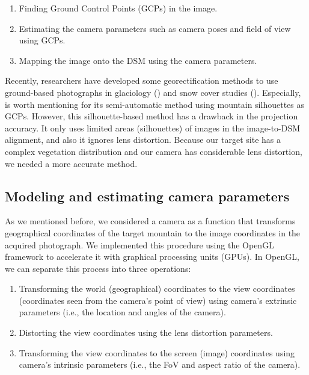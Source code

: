 \documentclass{article}
\providecommand{\tightlist}{%
  \setlength{\itemsep}{0pt}\setlength{\parskip}{0pt}}
\begin{document}
\begin{enumerate}
\def\labelenumi{\arabic{enumi}.}
\tightlist
\item
  Finding Ground Control Points (GCPs) in the image.\\
\item
  Estimating the camera parameters such as camera poses and field of view using GCPs.\\
\item
  Mapping the image onto the DSM using the camera parameters.
\end{enumerate}

Recently, researchers have developed some georectification methods to use ground-based photographs in glaciology (\cite{Messerli2015GeoInst}) and snow cover studies (\cite{Portenier2020Cryosphere}). Especially, \cite{Portenier2020Cryosphere} is worth mentioning for its semi-automatic method using mountain silhouettes as GCPs. However, this silhouette-based method has a drawback in the projection accuracy. It only uses limited areas (silhouettes) of images in the image-to-DSM alignment, and also it ignores lens distortion. Because our target site has a complex vegetation distribution and our camera has considerable lens distortion, we needed a more accurate method.

\hypertarget{modeling-and-estimating-camera-parameters}{%
\subsection{Modeling and estimating camera parameters}\label{modeling-and-estimating-camera-parameters}}

As we mentioned before, we considered a camera as a function that transforms geographical coordinates of the target mountain to the image coordinates in the acquired photograph. We implemented this procedure using the OpenGL framework to accelerate it with graphical processing units (GPUs). In OpenGL, we can separate this process into three operations:

\begin{enumerate}
\def\labelenumi{\arabic{enumi}.}
\tightlist
\item
  Transforming the world (geographical) coordinates to the view coordinates (coordinates seen from the camera's point of view) using camera's extrinsic parameters (i.e., the location and angles of the camera).\\
\item
  Distorting the view coordinates using the lens distortion parameters.\\
\item
  Transforming the view coordinates to the screen (image) coordinates using camera's intrinsic parameters (i.e., the FoV and aspect ratio of the camera).
\end{enumerate}
\end{document}
